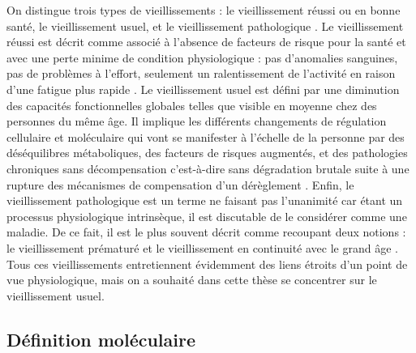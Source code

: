 On distingue trois types de vieillissements : le vieillissement réussi ou en bonne santé, le vieillissement usuel, et le vieillissement pathologique \cite{vanBuchem2004Dec}. Le vieillissement réussi est décrit comme associé à l'absence de facteurs de risque pour la santé et avec une perte minime de condition physiologique : pas d'anomalies sanguines, pas de problèmes à l'effort, seulement un ralentissement de l'activité en raison d'une fatigue plus rapide \cite{Berrut2013}. Le vieillissement usuel est défini par une diminution des capacités fonctionnelles globales telles que visible en moyenne chez des personnes du même âge. Il implique les différents changements de régulation cellulaire et moléculaire qui vont se manifester à l'échelle de la personne par des déséquilibres métaboliques, des facteurs de risques augmentés, et des pathologies chroniques sans décompensation c’est-à-dire sans dégradation brutale suite à une rupture des mécanismes de compensation d'un dérèglement \cite{Berrut2013}. Enfin, le vieillissement pathologique est un terme ne faisant pas l'unanimité car étant un processus physiologique intrinsèque, il est discutable de le considérer comme une maladie. De ce fait, il est le plus souvent décrit comme recoupant deux notions : le vieillissement prématuré et le vieillissement en continuité avec le grand âge \cite{Belmin2014}. Tous ces vieillissements entretiennent évidemment des liens étroits d'un point de vue physiologique, mais on a souhaité dans cette thèse se concentrer sur le vieillissement usuel.


\subsection{Définition moléculaire}


